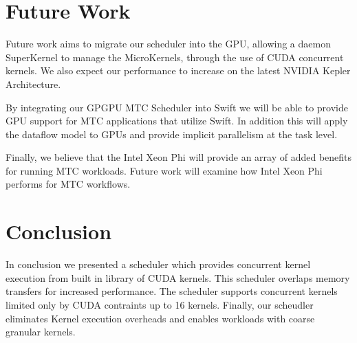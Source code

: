 \documentclass[conference]{IEEEtran}
\begin{document}
\section{Future Work}
Future work aims to migrate our scheduler into the GPU, allowing a daemon SuperKernel to manage the MicroKernels, through the use of CUDA concurrent kernels. We also expect our performance to increase on the latest NVIDIA Kepler Architecture. \cite{NVIDIA_Kepler}

By integrating our GPGPU MTC Scheduler into Swift we will be able to provide GPU support for MTC applications that utilize Swift. In addition this will apply the dataflow model to GPUs and provide implicit parallelism at the task level.

Finally, we believe that the Intel Xeon Phi will provide an array of added benefits for running MTC workloads. Future work will examine how Intel Xeon Phi performs for MTC workflows.

\section{Conclusion}
In conclusion we presented a scheduler which provides concurrent kernel execution from built in library of CUDA kernels. This scheduler overlaps memory transfers for increased performance. The scheduler supports concurrent kernels limited only by CUDA contraints up to 16 kernels. Finally, our scheudler eliminates Kernel execution overheads and enables workloads with coarse granular kernels.



\end{document}

